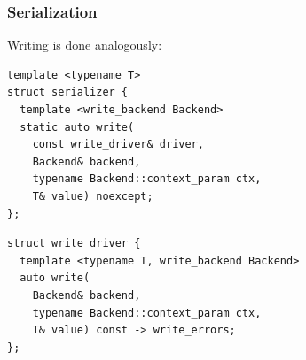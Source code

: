 \documentclass[compress,table,xcolor=table]{beamer}
\begin{document}
\begin{frame}[fragile]
  \frametitle{Serialization}
  Writing is done analogously:
  \begin{lstlisting}[language=c++2x,basicstyle=\footnotesize\ttfamily]
template <typename T>
struct serializer {
  template <write_backend Backend>
  static auto write(
    const write_driver& driver,
    Backend& backend,
    typename Backend::context_param ctx,
    T& value) noexcept;
};
  \end{lstlisting}
  \begin{lstlisting}[language=c++2x,basicstyle=\footnotesize\ttfamily]
struct write_driver {
  template <typename T, write_backend Backend>
  auto write(
    Backend& backend,
    typename Backend::context_param ctx,
    T& value) const -> write_errors;
};
  \end{lstlisting}
\end{frame}
\end{document}
